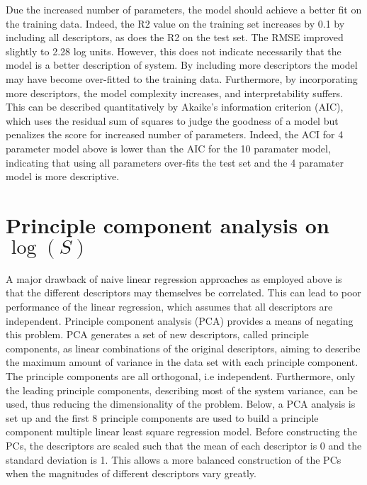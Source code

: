 \documentclass[11pt]{article}
\begin{document}
    Due the increased number of parameters, the model should achieve a
better fit on the training data. Indeed, the R2 value on the training
set increases by 0.1 by including all descriptors, as does the R2 on the
test set. The RMSE improved slightly to 2.28 log units. However, this
does not indicate necessarily that the model is a better description of
system. By including more descriptors the model may have become
over-fitted to the training data. Furthermore, by incorporating more
descriptors, the model complexity increases, and interpretability
suffers. This can be described quantitatively by Akaike's information
criterion (AIC), which uses the residual sum of squares to judge the
goodness of a model but penalizes the score for increased number of
parameters. Indeed, the ACI for 4 parameter model above is lower than
the AIC for the 10 paramater model, indicating that using all parameters
over-fits the test set and the 4 paramater model is more descriptive.

    \hypertarget{principle-component-analysis-on-logs}{%
\section{\texorpdfstring{Principle component analysis on
\(\log(S)\)}{Principle component analysis on \textbackslash{}log(S)}}\label{principle-component-analysis-on-logs}}

A major drawback of naive linear regression approaches as employed above
is that the different descriptors may themselves be correlated. This can
lead to poor performance of the linear regression, which assumes that
all descriptors are independent. Principle component analysis (PCA)
provides a means of negating this problem. PCA generates a set of new
descriptors, called principle components, as linear combinations of the
original descriptors, aiming to describe the maximum amount of variance
in the data set with each principle component. The principle components
are all orthogonal, i.e independent. Furthermore, only the leading
principle components, describing most of the system variance, can be
used, thus reducing the dimensionality of the problem. Below, a PCA
analysis is set up and the first 8 principle components are used to
build a principle component multiple linear least square regression
model. Before constructing the PCs, the descriptors are scaled such that
the mean of each descriptor is 0 and the standard deviation is 1. This
allows a more balanced construction of the PCs when the magnitudes of
different descriptors vary greatly.
\end{document}
